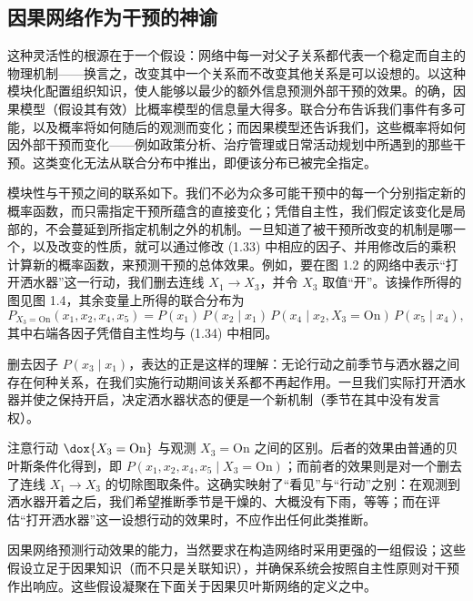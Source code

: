 \subsection{因果网络作为干预的神谕}

这种灵活性的根源在于一个假设：网络中每一对父子关系都代表一个稳定而自主的物理机制——换言之，改变其中一个关系而不改变其他关系是可以设想的。以这种模块化配置组织知识，使人能够以最少的额外信息预测外部干预的效果。的确，因果模型（假设其有效）比概率模型的信息量大得多。联合分布告诉我们事件有多可能，以及概率将如何随后的观测而变化；而因果模型还告诉我们，这些概率将如何因外部干预而变化——例如政策分析、治疗管理或日常活动规划中所遇到的那些干预。这类变化无法从联合分布中推出，即便该分布已被完全指定。

模块性与干预之间的联系如下。我们不必为众多可能干预中的每一个分别指定新的概率函数，而只需指定干预所蕴含的直接变化；凭借自主性，我们假定该变化是局部的，不会蔓延到所指定机制之外的机制。一旦知道了被干预所改变的机制是哪一个，以及改变的性质，就可以通过修改 \textup{(1.33)} 中相应的因子、并用修改后的乘积计算新的概率函数，来预测干预的总体效果。例如，要在图 1.2 的网络中表示“打开洒水器”这一行动，我们删去连线 $X_1\to X_3$，并令 $X_3$ 取值“开”。该操作所得的图见图 1.4，其余变量上所得的联合分布为
\begin{equation}
P_{X_3=\mathrm{On}}(x_1,x_2,x_4,x_5) = P(x_1)\,P(x_2\mid x_1)\,P(x_4\mid x_2,X_3=\mathrm{On})\,P(x_5\mid x_4), \tag{1.36}
\end{equation}
其中右端各因子凭借自主性均与 \textup{(1.34)} 中相同。

删去因子 $P(x_3\mid x_1)$，表达的正是这样的理解：无论行动之前季节与洒水器之间存在何种关系，在我们实施行动期间该关系都不再起作用。一旦我们实际打开洒水器并使之保持开启，决定洒水器状态的便是一个新机制（季节在其中没有发言权）。

注意行动 $\dox{X_3=\mathrm{On}}$ 与观测 $X_3=\mathrm{On}$ 之间的区别。后者的效果由普通的贝叶斯条件化得到，即 $P(x_1,x_2,x_4,x_5\mid X_3=\mathrm{On})$；而前者的效果则是对一个删去了连线 $X_1\to X_3$ 的切除图取条件。这确实映射了“看见”与“行动”之别：在观测到洒水器开着之后，我们希望推断季节是干燥的、大概没有下雨，等等；而在评估“打开洒水器”这一设想行动的效果时，不应作出任何此类推断。

因果网络预测行动效果的能力，当然要求在构造网络时采用更强的一组假设；这些假设立足于因果知识（而不只是关联知识），并确保系统会按照自主性原则对干预作出响应。这些假设凝聚在下面关于因果贝叶斯网络的定义之中。

